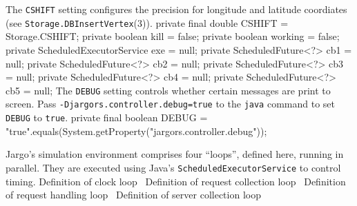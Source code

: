 The {\tt{}CSHIFT} setting configures the precision for longitude and latitude
coordiates (see {\tt{}Storage.\protect{}DBInsertVertex}(3)).
\nwenddocs{}\plusendmoddef
private final double CSHIFT = Storage.CSHIFT;
private boolean kill = false;
private boolean working = false;
private ScheduledExecutorService exe = null;
private ScheduledFuture<?> cb1 = null;
private ScheduledFuture<?> cb2 = null;
private ScheduledFuture<?> cb3 = null;
private ScheduledFuture<?> cb4 = null;
private ScheduledFuture<?> cb5 = null;
\nwendcode{}\nwdocspar
The {\tt{}DEBUG} setting controls whether certain messages are print to screen.
Pass {\tt{}-Djargors.controller.debug=true} to the {\tt{}java} command to set
{\tt{}DEBUG} to {\tt{}true}.
\nwenddocs{}\plusendmoddef
private final boolean DEBUG =
    "true".equals(System.getProperty("jargors.controller.debug"));
\nwendcode{}\nwdocspar

 Jargo's simulation environment comprises four ``loops'', defined
here, running in parallel. They are executed using Java's
{\tt{}ScheduledExecutorService} to control timing.
\nwenddocs{}\endmoddef{}
\LA{}Definition of clock loop~{\nwtagstyle{}}\RA{}
\LA{}Definition of request collection loop~{\nwtagstyle{}}\RA{}
\LA{}Definition of request handling loop~{\nwtagstyle{}}\RA{}
\LA{}Definition of server collection loop~{\nwtagstyle{}}\RA{}
\nwendcode{}\nwdocspar

